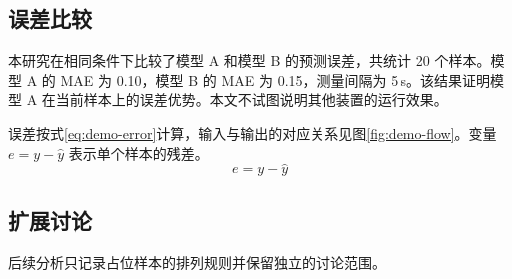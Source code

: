 \subsection{误差比较}
本研究在相同条件下比较了模型 A 和模型 B 的预测误差，共统计 20 个样本。模型 A 的 MAE 为 0.10，模型 B 的 MAE 为 0.15，测量间隔为 5\,s。该结果证明模型 A 在当前样本上的误差优势\cite{demo2026a}。本文不试图说明其他装置的运行效果。

误差按式\eqref{eq:demo-error}计算，输入与输出的对应关系见图\ref{fig:demo-flow}。变量 $e=y-\hat{y}$ 表示单个样本的残差。
\begin{equation}
e=y-\hat{y}
\label{eq:demo-error}
\end{equation}

\subsection{扩展讨论}
后续分析只记录占位样本的排列规则并保留独立的讨论范围。
